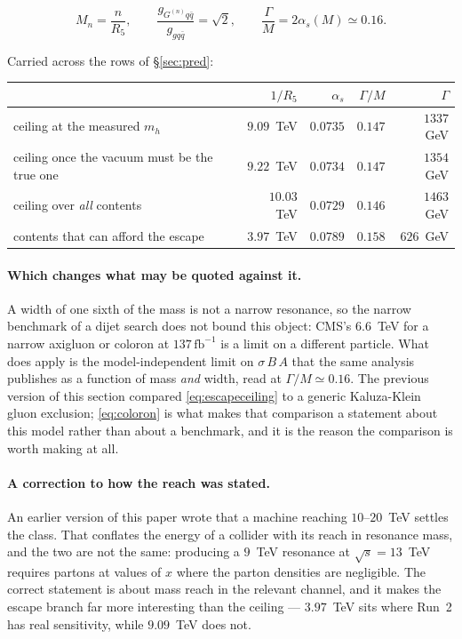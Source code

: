 \begin{keyeq}
\begin{equation}\label{eq:coloron}
  M_n=\frac{n}{R_5},
  \qquad
  \frac{g_{G^{(n)}q\bar q}}{g_{gq\bar q}}=\sqrt2,
  \qquad
  \frac{\Gamma}{M}=2\alpha_s(M)\simeq0.16 .
\end{equation}
\end{keyeq}

\noindent Carried across the rows of \S\ref{sec:pred}:

\begin{center}\small
{}
\begin{tabular}{lrrrr}
\toprule
\rowcolor{hdrblue!10} & $1/R_5$ & $\alpha_s$ & $\Gamma/M$ & $\Gamma$\\
\midrule
\rowcolor{amber!14}ceiling at the measured $m_h$ & $9.09$~TeV & $0.0735$ & $0.147$ & $1337$~GeV\\
ceiling once the vacuum must be the true one & $9.22$~TeV & $0.0734$ & $0.147$ & $1354$~GeV\\
ceiling over \emph{all} contents & $10.03$~TeV & $0.0729$ & $0.146$ & $1463$~GeV\\
contents that can afford the escape & $3.97$~TeV & $0.0789$ & $0.158$ & $626$~GeV\\
\bottomrule
\end{tabular}
\end{center}

\paragraph{Which changes what may be quoted against it.} A width of one sixth of the mass is not a
narrow resonance, so the narrow benchmark of a dijet search does not bound this object: CMS's
$6.6$~TeV for a narrow axigluon or coloron at $137\,\mathrm{fb}^{-1}$ \cite{CMSdijet} is a limit on
a different particle. What does apply is the model-independent limit on $\sigma\,B\,A$ that the
same analysis publishes as a function of mass \emph{and} width, read at $\Gamma/M\simeq0.16$. The
previous version of this section compared \eqref{eq:escapeceiling} to a generic Kaluza-Klein gluon
exclusion; \eqref{eq:coloron} is what makes that comparison a statement about this model rather
than about a benchmark, and it is the reason the comparison is worth making at all.

\paragraph{A correction to how the reach was stated.} An earlier version of this paper wrote that a
machine reaching $10$--$20$~TeV settles the class. That conflates the energy of a collider with its
reach in resonance mass, and the two are not the same: producing a $9$~TeV resonance at
$\sqrt s=13$~TeV requires partons at values of $x$ where the parton densities are negligible. The
correct statement is about mass reach in the relevant channel, and it makes the escape branch far
more interesting than the ceiling --- $3.97$~TeV sits where Run~2 has real sensitivity, while
$9.09$~TeV does not.

